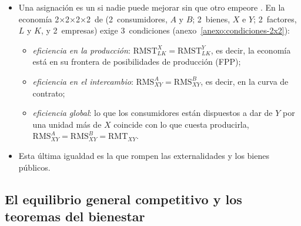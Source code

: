 \documentclass[11pt]{article}
\begin{document}
\begin{itemize}
\item Una asignación es un  si nadie puede mejorar sin que otro empeore . En la economía 2×2×2×2~de \textcite{Bator1957Simple} (2~consumidores, $A$ y $B$; 2~bienes, $X$ e $Y$; 2~factores, $L$ y $K$, y 2~empresas) exige 3~condiciones (anexo~\ref{anexo:condiciones-2x2}):
  \begin{itemize}
  \item \emph{eficiencia en la producción}: $\mathrm{RMST}^X_{LK}=\mathrm{RMST}^Y_{LK}$, es decir, la economía está en su frontera de posibilidades de producción (FPP);
  \item \emph{eficiencia en el intercambio}: $\mathrm{RMS}^A_{XY}=\mathrm{RMS}^B_{XY}$, es decir, en la curva de contrato;
  \item \emph{eficiencia global}: lo que los consumidores están dispuestos a dar de $Y$ por una unidad más de $X$ coincide con lo que cuesta producirla, $\mathrm{RMS}^A_{XY}=\mathrm{RMS}^B_{XY}=\mathrm{RMT}_{XY}$.
  \end{itemize}
\item Esta última igualdad es la que rompen las externalidades y los bienes públicos.
\end{itemize}

\subsection{El equilibrio general competitivo y los teoremas del bienestar}\label{sec:egc-teoremas}
\end{document}
